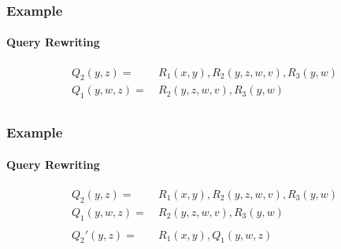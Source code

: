 \documentclass[
	11pt, %
]{beamer}
\begin{document}
\begin{frame}
	\frametitle{Example}
	\framesubtitle{Query Rewriting}
		\begin{align*}
			Q_2(y,z) =&\ R_1(x, y), R_2(y,z,w,v), R_3(y,w)\\
			Q_1(y,w,z) =&\ R_2(y,z,w,v), R_3(y,w)\\
		\end{align*}

\end{frame}

%	



\begin{frame}
	\frametitle{Example}
	\framesubtitle{Query Rewriting}
	\begin{align*}
		Q_2(y,z) =&\ R_1(x, y), R_2(y,z,w,v), R_3(y,w)\\
		Q_1(y,w,z) =&\ R_2(y,z,w,v), R_3(y,w)\\\\
		Q_2'(y,z) =&\ R_1(x, y), Q_1(y,w,z)
	\end{align*}
\end{frame}
\end{document}

